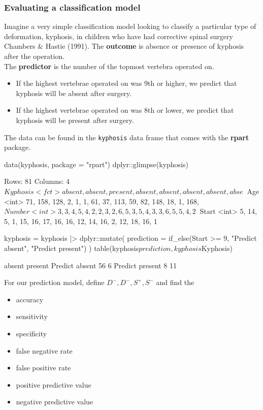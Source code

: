 \documentclass[a4paper]{article}\usepackage[]{graphicx}\usepackage[]{xcolor}
\begin{document}
\subsubsection{Evaluating a classification model}
Imagine a very simple classification model looking to classify a particular type of deformation, kyphosis, in children who have had corrective spinal surgery Chambers \& Hastie (1991).
The \textbf{outcome} is absence or presence of kyphosis after the operation.\\
The \textbf{predictor} is the number of the topmost vertebra operated on.
\begin{itemize}
	\item If the highest vertebrae operated on was 9th or higher, we predict that kyphosis will be absent after surgery.
	\item If the highest vertebrae operated on was 8th or lower, we predict that kyphosis will be present after surgery.
\end{itemize}
The data can be found in the \lstinline|kyphosis| data frame that comes with the \textbf{rpart} package.
\begin{Schunk}
\begin{Sinput}
data(kyphosis, package = "rpart")
dplyr::glimpse(kyphosis)
\end{Sinput}
\begin{Soutput}
Rows: 81
Columns: 4
$ Kyphosis <fct> absent, absent, present, absent, absent, absent, absent, abse~
$ Age      <int> 71, 158, 128, 2, 1, 1, 61, 37, 113, 59, 82, 148, 18, 1, 168, ~
$ Number   <int> 3, 3, 4, 5, 4, 2, 2, 3, 2, 6, 5, 3, 5, 4, 3, 3, 6, 5, 5, 4, 2~
$ Start    <int> 5, 14, 5, 1, 15, 16, 17, 16, 16, 12, 14, 16, 2, 12, 18, 16, 1~
\end{Soutput}
\begin{Sinput}
kyphosis = kyphosis |> 
  dplyr::mutate(
    prediction = if_else(Start >= 9, 
                         "Predict absent", 
                         "Predict present")
  )
table(kyphosis$prediction, kyphosis$Kyphosis)
\end{Sinput}
\begin{Soutput}
                 
                  absent present
  Predict absent      56       6
  Predict present      8      11
\end{Soutput}
\end{Schunk}
For our prediction model, define \( D^-, D^-, S^+, S^- \) and find the
\begin{itemize}
	\item accuracy
	\item sensitivity
	\item specificity
	\item false negative rate
	\item false positive rate
	\item positive predictive value
	\item negative predictive value
\end{itemize}
\end{document}
